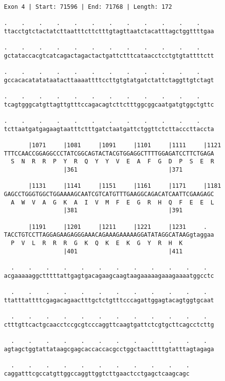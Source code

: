 \documentclass{article}
\begin{document}
\begin{Verbatim}[fontfamily=courier]
Exon 4 | Start: 71596 | End: 71768 | Length: 172

.    .    .    .    .    .    .    .    .    .    .    .    
ttacctgtctactatcttaatttcttctttgtagttaatctacatttagctggttttgaa

.    .    .    .    .    .    .    .    .    .    .    .    
gctataccacgtcatcagactagactactgattctttcataacctcctgtgtattttctt

.    .    .    .    .    .    .    .    .    .    .    .    
gccacacatatataatacttaaaattttccttgtgtatgatctattctaggttgtctagt

.    .    .    .    .    .    .    .    .    .    .    .    
tcagtgggcatgttagttgtttccagacagtcttctttggcggcaatgatgtggctgttc

.    .    .    .    .    .    .    .    .    .    .    .    
tcttaatgatgagaagtaatttctttgatctaatgattctggttctcttacccttaccta

       |1071     |1081     |1091     |1101     |1111     |1121
TTTCCAACCGGAGGCCCTATCGGCAGTACTACGTGGAGGCTTTTGGAGATCCTTCTGAGA
  S  N  R  R  P  Y  R  Q  Y  Y  V  E  A  F  G  D  P  S  E  R
                 |361                          |371         

       |1131     |1141     |1151     |1161     |1171     |1181
GAGCCTGGGTGGCTGGAAAAGCAATCGTCATGTTTGAAGGCAGACATCAATTCGAAGAGC
  A  W  V  A  G  K  A  I  V  M  F  E  G  R  H  Q  F  E  E  L
                 |381                          |391         

       |1191     |1201     |1211     |1221     |1231     .  
TACCTGTCCTTAGGAGAAGAGGGAAACAGAAAGAAAAAGGATATAGGCATAAGgtaggaa
  P  V  L  R  R  R  G  K  Q  K  E  K  G  Y  R  H  K         
                 |401                          |411         

  .    .    .    .    .    .    .    .    .    .    .    .  
acgaaaaaggctttttattgagtgacagaagcaagtaagaaaaagaaagaaaatggcctc

  .    .    .    .    .    .    .    .    .    .    .    .  
ttatttattttcgagacagaactttgctctgtttcccagattggagtacagtggtgcaat

  .    .    .    .    .    .    .    .    .    .    .    .  
ctttgttcactgcaacctccgcgtcccaggttcaagtgattctcgtgcttcagcctcttg

  .    .    .    .    .    .    .    .    .    .    .    .  
agtagctggtattataagcgagcaccaccacgcctggctaacttttgtatttagtagaga

  .    .    .    .    .    .    .    .    .    .    .
caggatttcgccatgttggccaggttggtcttgaactcctgagctcaagcagc
\end{Verbatim}
\end{document}
